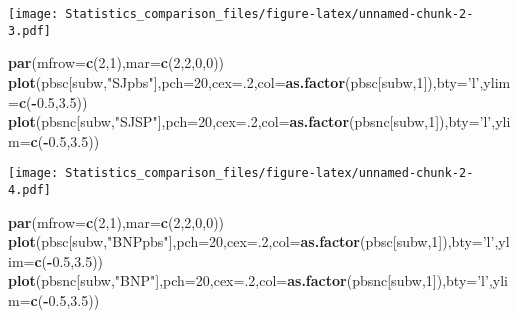 \documentclass[]{article}
\newenvironment{Shaded}{\begin{snugshade}}{\end{snugshade}}
\newcommand{\KeywordTok}[1]{\textcolor[rgb]{0.13,0.29,0.53}{\textbf{#1}}}
\newcommand{\DataTypeTok}[1]{\textcolor[rgb]{0.13,0.29,0.53}{#1}}
\newcommand{\DecValTok}[1]{\textcolor[rgb]{0.00,0.00,0.81}{#1}}
\newcommand{\FloatTok}[1]{\textcolor[rgb]{0.00,0.00,0.81}{#1}}
\newcommand{\StringTok}[1]{\textcolor[rgb]{0.31,0.60,0.02}{#1}}
\newcommand{\OperatorTok}[1]{\textcolor[rgb]{0.81,0.36,0.00}{\textbf{#1}}}
\newcommand{\NormalTok}[1]{#1}
\begin{document}
\texttt{[image: Statistics\_comparison\_files/figure-latex/unnamed-chunk-2-3.pdf]}

\begin{Shaded}
\begin{Highlighting}[]
\KeywordTok{par}\NormalTok{(}\DataTypeTok{mfrow=}\KeywordTok{c}\NormalTok{(}\DecValTok{2}\NormalTok{,}\DecValTok{1}\NormalTok{),}\DataTypeTok{mar=}\KeywordTok{c}\NormalTok{(}\DecValTok{2}\NormalTok{,}\DecValTok{2}\NormalTok{,}\DecValTok{0}\NormalTok{,}\DecValTok{0}\NormalTok{))}
\KeywordTok{plot}\NormalTok{(pbsc[subw,}\StringTok{"SJpbs"}\NormalTok{],}\DataTypeTok{pch=}\DecValTok{20}\NormalTok{,}\DataTypeTok{cex=}\NormalTok{.}\DecValTok{2}\NormalTok{,}\DataTypeTok{col=}\KeywordTok{as.factor}\NormalTok{(pbsc[subw,}\DecValTok{1}\NormalTok{]),}\DataTypeTok{bty=}\StringTok{'l'}\NormalTok{,}\DataTypeTok{ylim=}\KeywordTok{c}\NormalTok{(}\OperatorTok{-}\FloatTok{0.5}\NormalTok{,}\FloatTok{3.5}\NormalTok{))}
\KeywordTok{plot}\NormalTok{(pbsnc[subw,}\StringTok{"SJSP"}\NormalTok{],}\DataTypeTok{pch=}\DecValTok{20}\NormalTok{,}\DataTypeTok{cex=}\NormalTok{.}\DecValTok{2}\NormalTok{,}\DataTypeTok{col=}\KeywordTok{as.factor}\NormalTok{(pbsnc[subw,}\DecValTok{1}\NormalTok{]),}\DataTypeTok{bty=}\StringTok{'l'}\NormalTok{,}\DataTypeTok{ylim=}\KeywordTok{c}\NormalTok{(}\OperatorTok{-}\FloatTok{0.5}\NormalTok{,}\FloatTok{3.5}\NormalTok{))}
\end{Highlighting}
\end{Shaded}

\texttt{[image: Statistics\_comparison\_files/figure-latex/unnamed-chunk-2-4.pdf]}

\begin{Shaded}
\begin{Highlighting}[]
\KeywordTok{par}\NormalTok{(}\DataTypeTok{mfrow=}\KeywordTok{c}\NormalTok{(}\DecValTok{2}\NormalTok{,}\DecValTok{1}\NormalTok{),}\DataTypeTok{mar=}\KeywordTok{c}\NormalTok{(}\DecValTok{2}\NormalTok{,}\DecValTok{2}\NormalTok{,}\DecValTok{0}\NormalTok{,}\DecValTok{0}\NormalTok{))}
\KeywordTok{plot}\NormalTok{(pbsc[subw,}\StringTok{"BNPpbs"}\NormalTok{],}\DataTypeTok{pch=}\DecValTok{20}\NormalTok{,}\DataTypeTok{cex=}\NormalTok{.}\DecValTok{2}\NormalTok{,}\DataTypeTok{col=}\KeywordTok{as.factor}\NormalTok{(pbsc[subw,}\DecValTok{1}\NormalTok{]),}\DataTypeTok{bty=}\StringTok{'l'}\NormalTok{,}\DataTypeTok{ylim=}\KeywordTok{c}\NormalTok{(}\OperatorTok{-}\FloatTok{0.5}\NormalTok{,}\FloatTok{3.5}\NormalTok{))}
\KeywordTok{plot}\NormalTok{(pbsnc[subw,}\StringTok{"BNP"}\NormalTok{],}\DataTypeTok{pch=}\DecValTok{20}\NormalTok{,}\DataTypeTok{cex=}\NormalTok{.}\DecValTok{2}\NormalTok{,}\DataTypeTok{col=}\KeywordTok{as.factor}\NormalTok{(pbsnc[subw,}\DecValTok{1}\NormalTok{]),}\DataTypeTok{bty=}\StringTok{'l'}\NormalTok{,}\DataTypeTok{ylim=}\KeywordTok{c}\NormalTok{(}\OperatorTok{-}\FloatTok{0.5}\NormalTok{,}\FloatTok{3.5}\NormalTok{))}
\end{Highlighting}
\end{Shaded}
\end{document}

